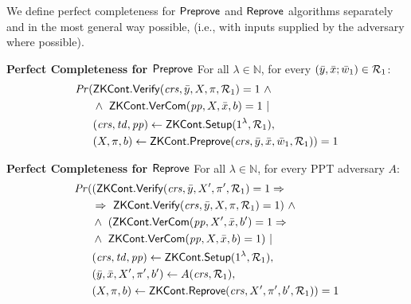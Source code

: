 \begin{definition}[ZK Continuations]
\noindent We define perfect completeness for ${\mathsf{Preprove}}$ and ${\mathsf{Reprove}}$ algorithms separately and in the most general way possible,
(i.e., with inputs supplied by the adversary where possible).  

\noindent \textbf{Perfect Completeness for ${\mathsf{Preprove}}$} For all $\lambda \in \mathbb{N}$, for every $(\bar{y}, \bar{x}; \bar{w}_1) \in \mathcal{R}_1$:
\begin{align*}
\mathit{Pr} (& \ZKCont.\Verify(\crs, \bar{y}, X, \pi, \relone) = 1 \ \wedge \ \\
                   &  \wedge \ \ZKCont.\VerifyCom (\pp, X, \barx, b) = 1\  | \ \\ 
                   & (\crs, \tw, \pp) \leftarrow \ZKCont.\Setup (1^{\lambda}, \relone), \\ 
                   & (X, \pi, b) \leftarrow \ZKCont.\Preprove(\crs, \bar{y}, \bar{x}, \baromega_1, \relone)) = 1
\end{align*}

\noindent \textbf{Perfect Completeness for ${\mathsf{Reprove}}$} For all $\lambda \in \mathbb{N}$, for every PPT adversary $A$: 
\begin{align*}
\mathit{Pr} (& ({\mathsf{ZKCont}}.{\mathsf{Verify}}(\mathit{crs}, \bar{y}, X', \pi', \mathcal{R}_1) = 1  \Rightarrow \\
                   & \Rightarrow \ {\mathsf{ZKCont}}.{\mathsf{Verify}}(\mathit{crs}, \bar{y}, X, \pi, \mathcal{R}_1) = 1)  \ \wedge \  \\
                   & \wedge \ ({\mathsf{ZKCont}}.{\mathsf{VerCom}} (\mathit{pp}, X', \bar{x}, b') = 1 \Rightarrow \\ 
                   & \wedge \ {\mathsf{ZKCont}}.{\mathsf{VerCom}} (\mathit{pp}, X, \bar{x}, b) = 1) \ | \\
                   & (\mathit{crs}, \mathit{td}, \mathit{pp}) \leftarrow {\ensuremath{\mathsf{ZKCont}}}.{\mathsf{Setup}} (1^{\lambda}, \mathcal{R}_1), \\
                   & (\bar{y}, \bar{x}, X', \pi', b') \leftarrow A(\mathit{crs},\mathcal{R}_1), \\
                   & (X, \pi, b) \leftarrow {\ensuremath{\mathsf{ZKCont}}}.{\mathsf{Reprove}}(\mathit{crs}, X', \pi', b', \mathcal{R}_1)) = 1
\end{align*}

\begin{comment}
\begin{align*}
\mathit{Pr} (& (\ZKCont.\Verify(\crs, \bar{y}, X, \pi, \relone) = 1  = >  \ZKCont.\Verify(\crs, \bar{y}, X', \pi', \relone) = 1)  \ \wedge \  \\
                   & \wedge \ (\ZKCont.\VerifyCom (\pp, X, \barx, b) = 1 => \ZKCont.\VerifyCom (\pp, X', \barx, b') = 1) \ | \\
                   & (\crs, \tw, \pp) \leftarrow \ZKCont.\Setup (1^{\lambda}, \relone), \\ 
                   & (\bary, \barx, X, \pi, b) \leftarrow A(\crs,\pp, \relone) \\
                   & (X', \pi', b') \leftarrow \ZKCont.\Reprove(\crs, X, \pi, b, \relone)) = 1
\end{align*}
\end{comment}


\end{definition}
